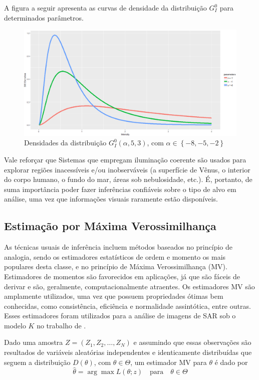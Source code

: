 \documentclass[12pt]{article}
\begin{document}
A figura a seguir apresenta as curvas de densidade da distribuição $G_I^0$ para determinados parâmetros.
\begin{figure}[H]
     \centering
     \includegraphics[scale=0.5]{GI0Densities.png}
     \caption{Densidades da distribuição $G_I^0(\alpha, 5, 3)$, com $\alpha \in \left \{  -8, -5, -2 \right \}$}
     \label{graf_1}
\end{figure}

Vale reforçar que Sistemas que empregam iluminação coerente são usados para explorar regiões inacessíveis e/ou inobserváveis (a superfície de Vênus, o interior do corpo humano, o fundo do mar, áreas sob nebulosidade, etc.). É, portanto, de suma importância poder fazer inferências confiáveis sobre o tipo de alvo em análise, uma vez que informações visuais raramente estão disponíveis.


\subsection{Estimação por Máxima Verossimilhança}

As técnicas usuais de inferência incluem métodos baseados no princípio de analogia, sendo os estimadores estatísticos de ordem e momento os mais populares desta classe, e no princípio de Máxima Verossimilhança (MV). Estimadores de momentos são favorecidos em aplicações, já que são fáceis de derivar e são, geralmente, computacionalmente atraentes. Os estimadores MV são amplamente utilizados, uma vez que possuem propriedades ótimas bem conhecidas, como consistência, eficiência e normalidade assintótica, entre outras. Esses estimadores foram utilizados para a análise de imagens de SAR sob o modelo $K$ no trabalho de \citet{KMaxVer_Joughin}.

Dado uma amostra $Z = (Z_1, Z_2, \dots, Z_N)$ e assumindo que essas observações são resultados de variáveis aleatórias independentes e identicamente distribuídas que seguem a distribuição $D(\theta)$, com $\theta \in \Theta$, um estimador MV para $\theta$ é dado por
\begin{equation}
    \widehat{\theta} = \arg\max L(\theta; z) \quad \text{para} \quad \theta \in \Theta \label{eq:mv}
\end{equation}
\end{document}
